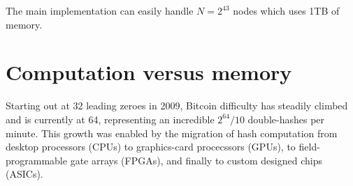 \documentclass[11pt, oneside]{article}
\begin{document}
The main implementation can easily handle $N=2^{43}$ nodes which uses 1TB of memory.


\section{Computation versus memory}
Starting out at 32 leading zeroes in 2009, Bitcoin difficulty
has steadily climbed and is currently
at 64, representing an incredible $2^{64}/10$ double-hashes per minute.
This growth was enabled by the migration of hash computation from 
desktop processors (CPUs) to graphics-card procecssors (GPUs),
to field-programmable gate arrays (FPGAs), and finally to custom designed
chips (ASICs).
\end{document}
